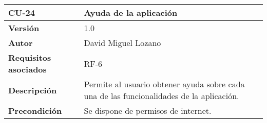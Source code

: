 \begin{longtable}[H]{@{}ll@{}}
\toprule
\begin{minipage}[b]{0.20\columnwidth}\raggedright\strut
\textbf{CU-24}\strut
\end{minipage} & \begin{minipage}[b]{0.74\columnwidth}\raggedright\strut
\textbf{Ayuda de la aplicación}\strut
\end{minipage}\tabularnewline
\midrule
\endhead
\begin{minipage}[t]{0.20\columnwidth}\raggedright\strut
\textbf{Versión}\strut
\end{minipage} & \begin{minipage}[t]{0.74\columnwidth}\raggedright\strut
1.0\strut
\end{minipage}\tabularnewline
\begin{minipage}[t]{0.20\columnwidth}\raggedright\strut
\textbf{Autor}\strut
\end{minipage} & \begin{minipage}[t]{0.74\columnwidth}\raggedright\strut
David Miguel Lozano\strut
\end{minipage}\tabularnewline
\begin{minipage}[t]{0.20\columnwidth}\raggedright\strut
\textbf{Requisitos asociados}\strut
\end{minipage} & \begin{minipage}[t]{0.74\columnwidth}\raggedright\strut
RF-6\strut
\end{minipage}\tabularnewline
\begin{minipage}[t]{0.20\columnwidth}\raggedright\strut
\textbf{Descripción}\strut
\end{minipage} & \begin{minipage}[t]{0.74\columnwidth}\raggedright\strut
Permite al usuario obtener ayuda sobre cada una de las funcionalidades
de la aplicación.\strut
\end{minipage}\tabularnewline
\begin{minipage}[t]{0.20\columnwidth}\raggedright\strut
\textbf{Precondición}\strut
\end{minipage} & \begin{minipage}[t]{0.74\columnwidth}\raggedright\strut
Se dispone de permisos de internet.


\end{minipage}
\end{longtable}
